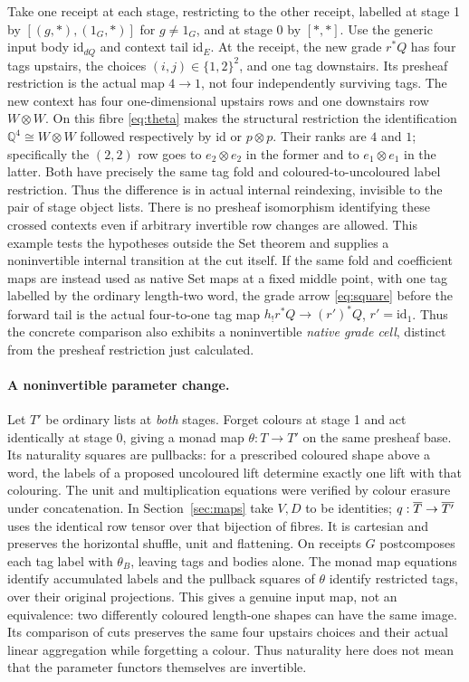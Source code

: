 \documentclass[11pt]{article}
\theoremstyle{definition}\newtheorem{definition}[theorem]{Definition}
\newcommand{\id}{\mathrm{id}}\newcommand{\op}{\mathrm{op}}\newcommand{\dom}{\mathrm{dom}}
\begin{document}
Take one receipt at each stage, restricting to the other receipt,
labelled at stage 1 by $[(g,*),(1_G,*)]$ for $g\ne1_G$, and at
stage 0 by $[*,*]$. Use the generic input body $\id_{dQ}$ and
context tail $\id_E$. At the receipt, the new grade $r^*Q$ has
four tags upstairs, the choices $(i,j)\in\{1,2\}^2$, and one tag
downstairs. Its presheaf restriction is the actual map $4\to1$,
not four independently surviving tags. The new context has four
one-dimensional upstairs rows and one downstairs row $W\otimes W$.
On this fibre \eqref{eq:theta} makes the structural restriction the
identification $\mathbb Q^4\cong W\otimes W$ followed respectively
by $\id$ or $p\otimes p$. Their ranks are $4$ and $1$; specifically
the $(2,2)$ row goes to $e_2\otimes e_2$ in the former and to
$e_1\otimes e_1$ in the latter. Both have precisely the same tag
fold and coloured-to-uncoloured label restriction. Thus the difference
is in actual internal reindexing, invisible to the pair of stage
object lists. There is no presheaf isomorphism identifying these
crossed contexts even if arbitrary invertible row changes are allowed.
This example tests the hypotheses outside the Set theorem and supplies
a noninvertible internal transition at the cut itself. If the same fold
and coefficient maps are instead used as native Set maps at a fixed
middle point, with one tag labelled by the ordinary length-two word,
the grade arrow \eqref{eq:square} before the forward tail is the
actual four-to-one tag map $h_!r^*Q\to(r')^*Q$, $r'=\id_1$.
Thus the concrete comparison also exhibits a noninvertible
\emph{native grade cell}, distinct from the presheaf restriction
just calculated.

\paragraph{A noninvertible parameter change.}
Let $T'$ be ordinary lists at \emph{both} stages. Forget colours at
stage 1 and act identically at stage 0, giving a monad map
$\theta:T\to T'$ on the same presheaf base. Its naturality squares
are pullbacks: for a prescribed coloured shape above a word, the
labels of a proposed uncoloured lift determine exactly one lift with
that colouring. The unit and multiplication equations were verified
by colour erasure under concatenation. In Section~\ref{sec:maps}
take $V,D$ to be identities; $q:\overline T\to\overline{T'}$ uses the
identical row tensor over that bijection of fibres. It is cartesian
and preserves the horizontal shuffle, unit and flattening.
On receipts $G$ postcomposes each tag label with $\theta_B$, leaving
tags and bodies alone. The monad map equations identify accumulated
labels and the pullback squares of $\theta$ identify restricted
tags, over their original projections. This gives a genuine input
map, not an equivalence: two differently coloured length-one shapes
can have the same image. Its comparison of cuts preserves the same
four upstairs choices and their actual linear aggregation while
forgetting a colour. Thus naturality here does not mean that the
parameter functors themselves are invertible.
\end{document}
